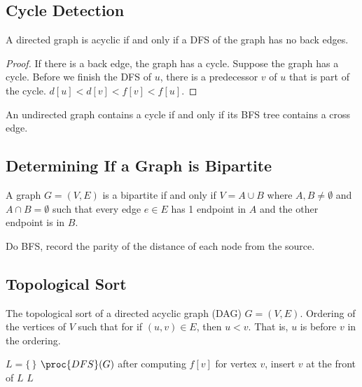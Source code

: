 \subsection{Cycle Detection}

\vspace{\parskip}

\begin{lemma}
    A directed graph is acyclic if and only if a DFS of the graph has no back edges.
\end{lemma}

\begin{proof}
    If there is a back edge, the graph has a cycle. Suppose the graph has a cycle. Before we finish the DFS of $u$, there is a predecessor $v$ of $u$ that is part of the cycle. $d[u] < d[v] < f[v] < f[u]$.
\end{proof}

\begin{lemma}
    An undirected graph contains a cycle if and only if its BFS tree contains a cross edge.
\end{lemma}

\subsection{Determining If a Graph is Bipartite}

\vspace{\parskip}

\begin{definition}
    A graph $G=(V,E)$ is a bipartite if and only if $V = A \cup B$ where $A,B \neq \emptyset$ and $A \cap B = \emptyset$ such that every edge $e \in E$ has 1 endpoint in $A$ and the other endpoint is in $B$. 
\end{definition}

Do BFS, record the parity of the distance of each node from the source.

\subsection{Topological Sort}

The topological sort of a directed acyclic graph (DAG) $G = (V,E)$. Ordering of the vertices of $V$ such that for if $(u,v) \in E$, then $u < v$. That is, $u$ is before $v$ in the ordering.

\begin{codebox}
    \li $L = \{ \, \}$ 
    \li $\proc{DFS}(G)$ 
    \li \> after computing $f[v]$ for vertex $v$, insert $v$ at the front of $L$
    \li \Return $L$  
\end{codebox}

